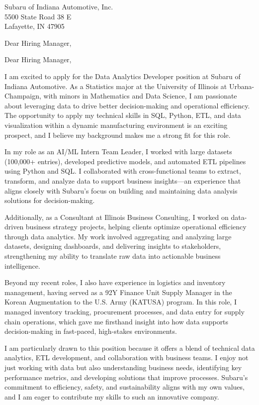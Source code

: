 \documentclass{letter}
\begin{document}
\begin{letter}{
    Subaru of Indiana Automotive, Inc.\\
    5500 State Road 38 E\\
    Lafayette, IN 47905
}


\opening{Dear Hiring Manager,}


Dear Hiring Manager,

I am excited to apply for the Data Analytics Developer position at Subaru of Indiana Automotive. As a Statistics major at the University of Illinois at Urbana-Champaign, with minors in Mathematics and Data Science, I am passionate about leveraging data to drive better decision-making and operational efficiency. The opportunity to apply my technical skills in SQL, Python, ETL, and data visualization within a dynamic manufacturing environment is an exciting prospect, and I believe my background makes me a strong fit for this role.

In my role as an AI/ML Intern Team Leader, I worked with large datasets (100,000+ entries), developed predictive models, and automated ETL pipelines using Python and SQL. I collaborated with cross-functional teams to extract, transform, and analyze data to support business insights—an experience that aligns closely with Subaru’s focus on building and maintaining data analysis solutions for decision-making.

Additionally, as a Consultant at Illinois Business Consulting, I worked on data-driven business strategy projects, helping clients optimize operational efficiency through data analytics. My work involved aggregating and analyzing large datasets, designing dashboards, and delivering insights to stakeholders, strengthening my ability to translate raw data into actionable business intelligence.

Beyond my recent roles, I also have experience in logistics and inventory management, having served as a 92Y Finance Unit Supply Manager in the Korean Augmentation to the U.S. Army (KATUSA) program. In this role, I managed inventory tracking, procurement processes, and data entry for supply chain operations, which gave me firsthand insight into how data supports decision-making in fast-paced, high-stakes environments.

I am particularly drawn to this position because it offers a blend of technical data analytics, ETL development, and collaboration with business teams. I enjoy not just working with data but also understanding business needs, identifying key performance metrics, and developing solutions that improve processes. Subaru’s commitment to efficiency, safety, and sustainability aligns with my own values, and I am eager to contribute my skills to such an innovative company.


\end{letter}
\end{document}
